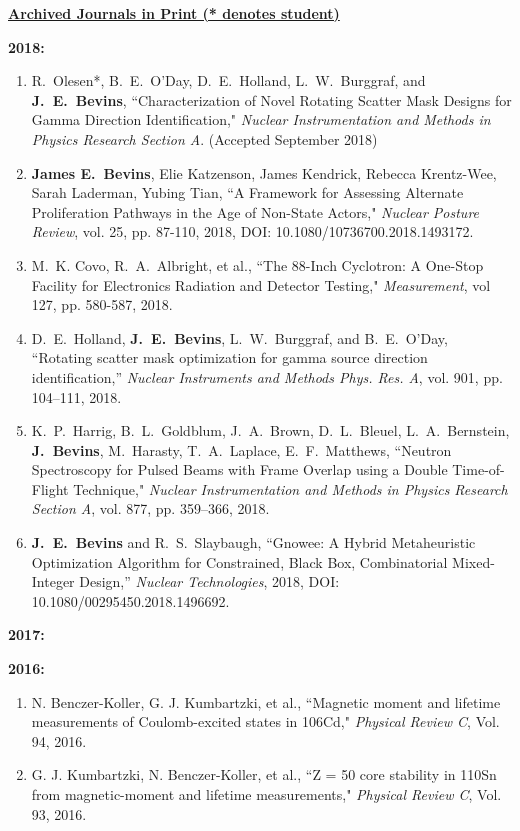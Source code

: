 \underline{\textbf{Archived Journals in Print (* denotes student)}}

\textbf{2018:}
\begin{enumerate}
   \item R.\ Olesen*, B.\ E.\ O’Day, D.\ E.\ Holland, L.\ W.\ Burggraf, and \textbf{J.\ E.\ Bevins}, ``Characterization of Novel Rotating Scatter Mask Designs for Gamma Direction Identification," \textit{Nuclear Instrumentation and Methods in Physics Research Section A}. (Accepted September 2018)
   
  \item \textbf{James E.\ Bevins}, Elie Katzenson, James Kendrick, Rebecca Krentz-Wee, Sarah Laderman, Yubing Tian, ``A Framework for Assessing Alternate Proliferation Pathways in the Age of Non-State Actors,"  \textit{Nuclear Posture Review}, vol. 25, pp. 87-110, 2018, DOI: 10.1080/10736700.2018.1493172. 
  
  \item M.\ K. Covo, R.\ A.\ Albright, et al., ``The 88-Inch Cyclotron: A One-Stop Facility for Electronics Radiation and Detector Testing," \textit{Measurement}, vol 127, pp. 580-587, 2018. 
  
  \item D.\ E.\ Holland, \textbf{J.\ E.\ Bevins}, L.\ W.\ Burggraf, and B.\ E.\ O’Day, ``Rotating scatter mask optimization for gamma source direction identification,” \textit{Nuclear Instruments and Methods Phys. Res. A}, vol. 901, pp. 104–111, 2018.
  
  \item K.\ P.\ Harrig, B.\ L.\ Goldblum, J.\ A.\ Brown, D.\ L.\ Bleuel, L.\ A.\ Bernstein, \textbf{J.\ Bevins}, M.\ Harasty, T.\ A.\ Laplace, E.\ F.\ Matthews, ``Neutron Spectroscopy for Pulsed Beams with Frame Overlap using a Double Time-of-Flight Technique," \textit{Nuclear Instrumentation and Methods in Physics Research Section A}, vol. 877, pp. 359–366, 2018.

  \item \textbf{J.\ E.\ Bevins} and R.\ S.\ Slaybaugh, ``Gnowee: A Hybrid Metaheuristic Optimization Algorithm for Constrained, Black Box, Combinatorial Mixed-Integer Design,” \textit{Nuclear Technologies}, 2018, DOI: 10.1080/00295450.2018.1496692.
\end{enumerate}

\textbf{2017:}

\textbf{2016:}
\begin{enumerate}
  \item N. Benczer-Koller, G. J. Kumbartzki, et al., ``Magnetic moment and lifetime measurements of Coulomb-excited states in 106Cd," \textit{Physical Review C}, Vol. 94, 2016.
  
  \item G. J. Kumbartzki, N. Benczer-Koller, et al., ``Z = 50 core stability in 110Sn from magnetic-moment and lifetime measurements," \textit{Physical Review C}, Vol. 93, 2016.
\end{enumerate}

